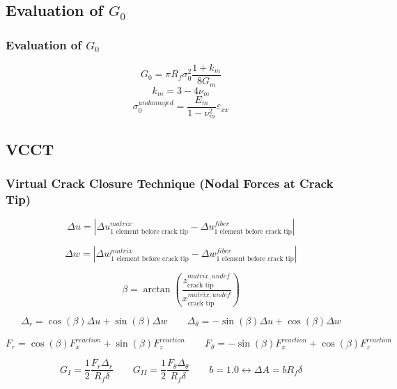 \documentclass[first,firstsupp,lastsupp,handout,last,hyperref,table]{ETHclass}
\begin{document}
\subsection{Evaluation of $G_{0}$}
\begin{frame}
\frametitle{\small Evaluation of $G_{0}$}
\vspace{-0.7cm}
\footnotesize
\centering
\captionsetup[figure]{font=scriptsize,labelfont=scriptsize}
\begin{equation}
G_{0}=\pi R_{f}\sigma^{2}_{0}\frac{1+k_{m}}{8G_{m}}
\end{equation}
\begin{equation}
k_{m}=3-4\nu_{m}
\end{equation}
\begin{equation}
\sigma_{0}^{undamaged}=\frac{E_{m}}{1-\nu^{2}_{m}}\varepsilon_{xx}
\end{equation}%
\end{frame}

\subsection{VCCT}
\begin{frame}
\frametitle{\small Virtual Crack Closure Technique (Nodal Forces at Crack Tip)}
\vspace{-0.5cm}
\tiny
\centering

\begin{equation}
\Delta u =\left|\Delta u^{matrix}_{\text{1 element before crack tip}}-\Delta u^{fiber}_{\text{1 element before crack tip}}\right|
\end{equation}

\begin{equation}
\Delta w =\left|\Delta w^{matrix}_{\text{1 element before crack tip}}-\Delta w^{fiber}_{\text{1 element before crack tip}}\right|
\end{equation}



\begin{equation}
\beta=\arctan{\left(\frac{z^{matrix, undef}_{\text{crack tip}}}{x^{matrix, undef}_{\text{crack tip}}}\right)}
\end{equation}

\begin{equation}
\Delta_{r}=\cos{\left(\beta\right)}\Delta u+\sin{\left(\beta\right)}\Delta w\qquad\Delta_{\theta}=-\sin{\left(\beta\right)}\Delta u+\cos{\left(\beta\right)}\Delta w
\end{equation}

\begin{equation}
F_{r}=\cos{\left(\beta\right)}F^{reaction}_{x}+\sin{\left(\beta\right)}F^{reaction}_{z}\qquad F_{\theta}=-\sin{\left(\beta\right)}F^{reaction}_{x}+\cos{\left(\beta\right)}F^{reaction}_{z}
\end{equation}

\begin{equation}
G_{I}=\frac{1}{2}\frac{F_{r}\Delta_{r}}{R_{f}\delta}\qquad G_{II}=\frac{1}{2}\frac{F_{\theta}\Delta_{\theta}}{R_{f}\delta}\qquad b=1.0\leftrightarrow\Delta A = bR_{f}\delta
\end{equation}
\end{frame}
\end{document}

